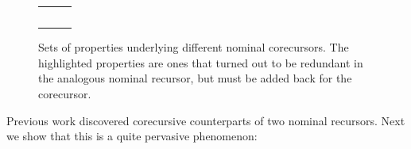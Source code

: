 \begin{figure}[!t]
\hspace*{-1.2ex}
		{\small 
			\begin{tabular}{ccc} \vspace*{-1.2ex}
				\perFreeCoRec{} & \perFreeBVrCoRec{} & \swapFreeCoRecV 
				\\  & & \\ \vspace*{-1.2ex}
				  & \swapFreeBVrCoRec &  \swapFreeCgCoRec 
					\\    	\vspace*{-1.3ex}
					  & & \\		
		\substFreshCoRec \hspace*{-2.5ex}	& \renamingCoRec  \hspace*{-2.5ex} & \renamingFreshVCoRec 
			\end{tabular}
		} %
    \vspace*{-1.5ex}
	\caption{Sets of properties %
		underlying different nominal corecursors. 
		The highlighted properties are ones that turned out to be redundant in the 
		analogous nominal recursor, but must be added back for the corecursor.}
	\label{fig-coiter}
	\vspace*{-2ex}
\end{figure} 



Previous work \cite{DBLP:conf/cmcs/KurzPSV12,DBLP:journals/pacmpl/BlanchetteGPT19}  
discovered corecursive counterparts of two nominal recursors. 
Next we show that this is %
a quite pervasive phenomenon: 


